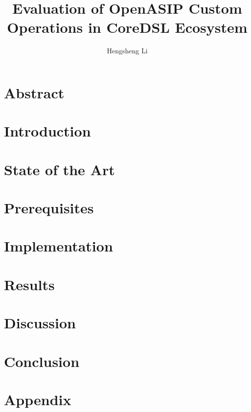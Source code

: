\documentclass[
  a4paper,            %
  thesis=student,     %
  english,            %
  coverpage=false,    %
  titlepage=false,    %
  oneside,            %
  font=times          %
]{tumbook}
\title{Evaluation of OpenASIP Custom Operations in CoreDSL Ecosystem}
\subtitle{}
\author{Hengsheng Li}
\begin{document}
\frontmatter
\maketitle
\chapter{Abstract}

\tableofcontents

\mainmatter
\chapter{Introduction}


\chapter{State of the Art}


\chapter{Prerequisites}


\chapter*{Implementation}


\chapter{Results}


\chapter{Discussion}


\chapter{Conclusion}


\appendix
\chapter{Appendix}
\lipsum[4]

\backmatter


\end{document}
